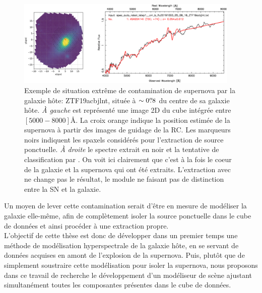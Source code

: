 \documentclass[../main/main.tex]{subfiles}
\begin{document}
\begin{figure}[ht]
  \centering
  \includegraphics[width=0.95\textwidth]{../figures/03_sedm/stronghost.png}
  \caption[Exemple de situation extrême de contamination de supernova
  par la galaxie hôte]{Exemple de situation extrême de contamination de
    supernova par la galaxie hôte: ZTF19acbjlnt, située à $\sim0\overset{\prime\prime}{.}8$
    du centre de sa galaxie hôte. \textit{À gauche} est représenté
    une image 2D du cube intégrée entre $[5000-8000]$\AA. La croix
    orange indique la position estimée de la supernova à partir des
    images de guidage de la RC. Les marqueurs noirs indiquent les
    spaxels considérés pour l'extraction de source ponctuelle. \textit{À droite} le spectre extrait en
    noir et la tentative de classification par . On voit ici
    clairement que c'est à la fois le coeur de la galaxie et la
    supernova qui ont été extraits. L'extraction avec  ne
    change pas le résultat, le module ne faisant pas de distinction entre la SN et
    la galaxie.}
  \label{fig:stronghost}
\end{figure}

Un moyen de lever cette contamination serait d'être en mesure de
modéliser la galaxie elle-même, afin de complètement isoler la source
ponctuelle dans le cube de données et ainsi procéder à une extraction
propre.\\

L'objectif de cette thèse est donc de développer dans un premier temps une méthode de
modélisation hyperspectrale de la galaxie hôte, en se servant
de données acquises en amont de l'explosion de la supernova. Puis,
plutôt que de simplement soustraire cette modélisation pour isoler la
supernova, nous proposons dans ce travail de recherche le développement d'un modéliseur de
scène ajustant simultanément toutes les composantes présentes dans le cube de données.

%
%
\end{document}
